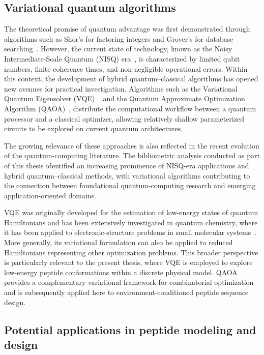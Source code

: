 \subsection{Variational quantum algorithms}

The theoretical promise of quantum advantage was first demonstrated through algorithms such as Shor's for factoring integers and Grover's for database searching~\cite{nielsen2010quantum,paper_dani}. However, the current state of technology, known as the Noisy Intermediate-Scale Quantum (NISQ) era~\cite{preskill2018quantum}, is characterized by limited qubit numbers, finite coherence times, and non-negligible operational errors. Within this context, the development of hybrid quantum–classical algorithms has opened new avenues for practical investigation. Algorithms such as the Variational Quantum Eigensolver (VQE) ~\cite{peruzzo2014variational} and the Quantum Approximate Optimization Algorithm (QAOA)~\cite{QAOA}, distribute the computational workflow between a quantum processor and a classical optimizer, allowing relatively shallow parameterized circuits to be explored on current quantum architectures.

The growing relevance of these approaches is also reflected in the recent evolution of the quantum-computing literature. The bibliometric analysis conducted as part of this thesis identified an increasing prominence of NISQ-era applications and hybrid quantum–classical methods, with variational algorithms contributing to the connection between foundational quantum-computing research and emerging application-oriented domains. 

VQE was originally developed for the estimation of low-energy states of quantum Hamiltonians and has been extensively investigated in quantum chemistry, where it has been applied to electronic-structure problems in small molecular systems~\cite{mcclean2016theory}. More generally, its variational formulation can also be applied to reduced Hamiltonians representing other optimization problems. This broader perspective is particularly relevant to the present thesis, where VQE is employed to explore low-energy peptide conformations within a discrete physical model. QAOA provides a complementary variational framework for combinatorial optimization and is subsequently applied here to environment-conditioned peptide sequence design.


\subsection{Potential applications in peptide modeling and design}

